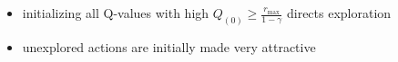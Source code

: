 \begin{frame}
\begin{enumerate}
{	\begin{itemize}
		\item initializing all Q-values with high 
			$Q_{(0)} \geq \frac{r_\text{max}}{1-\gamma}$ directs exploration
		\vspace{1mm}
		\item unexplored actions are initially made very attractive
		
	\end{itemize}
	}


\end{enumerate}

\end{frame}

